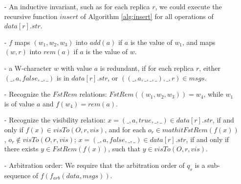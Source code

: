 \begin{itemize}
\setlength{\itemsep}{0.5pt}
\item[-] An inductive invariant, such as for each replica $r$, we could execute the recursive function $\mathit{insert}$ of Algorithm \ref{alg:insert} for all operations of  $\mathit{data}[r].\mathit{str}$.

\item[-] $f$ maps $(w_1,w_2,w_3)$ into $\mathit{add}(a)$ if $a$ is the value of $w_1$, and maps $(w,r)$ into $\mathit{rem}(a)$ if $a$ is the value of $w$.

\item[-] a W-character $w$ with value $a$ is redundant, if for each replica $r$, either $(\_,a,\mathit{false},\_,\_)$ is in $data[r].str$, or $((\_,a,\_,\_,\_),\_,r) \in msgs$.

\item[-] Recognize the $\mathit{FstRem}$ relations: $\mathit{FstRem}((w_1,w_2,w_3)) = w_4$, while $w_1$ is of value $a$ and $f(w_4) = \mathit{rem}(a)$. %

\item[-] Recognize the visibility relation: $x = (\_,a,\mathit{true},\_,\_) \in data[r].str$, if and only if $f(x) \in \mathit{visTo}(O,r,\mathit{vis})$, and for each $o_r \in mathit{FstRem}(f(x))$, $o_r \notin \mathit{visTo}(O,r,\mathit{vis})$; $x = (\_,a,\mathit{false},\_,\_) \in data[r].str$, if and only if there exists $y \in \mathit{FstRem}(f(x))$, such that $y \in \mathit{visTo}(O,r,\mathit{vis})$.

\item[-] Arbitration order: We require that the arbitration order of $q_s$ is a sub-sequence of $f(f_{\mathit{arb}}(data,msgs))$.
\end{itemize}






















































